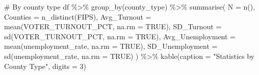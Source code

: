 \documentclass[
  11pt,
]{article}
\newenvironment{Shaded}{\begin{snugshade}}{\end{snugshade}}
\newcommand{\AttributeTok}[1]{\textcolor[rgb]{0.40,0.45,0.13}{#1}}
\newcommand{\CommentTok}[1]{\textcolor[rgb]{0.37,0.37,0.37}{#1}}
\newcommand{\ConstantTok}[1]{\textcolor[rgb]{0.56,0.35,0.01}{#1}}
\newcommand{\DecValTok}[1]{\textcolor[rgb]{0.68,0.00,0.00}{#1}}
\newcommand{\FunctionTok}[1]{\textcolor[rgb]{0.28,0.35,0.67}{#1}}
\newcommand{\NormalTok}[1]{\textcolor[rgb]{0.00,0.23,0.31}{#1}}
\newcommand{\SpecialCharTok}[1]{\textcolor[rgb]{0.37,0.37,0.37}{#1}}
\newcommand{\StringTok}[1]{\textcolor[rgb]{0.13,0.47,0.30}{#1}}
\begin{document}
\begin{Shaded}
\begin{Highlighting}[]
\CommentTok{\# By county type}
\NormalTok{df }\SpecialCharTok{\%\textgreater{}\%}
  \FunctionTok{group\_by}\NormalTok{(county\_type) }\SpecialCharTok{\%\textgreater{}\%}
  \FunctionTok{summarise}\NormalTok{(}
    \AttributeTok{N =} \FunctionTok{n}\NormalTok{(),}
    \AttributeTok{Counties =} \FunctionTok{n\_distinct}\NormalTok{(FIPS),}
    \AttributeTok{Avg\_Turnout =} \FunctionTok{mean}\NormalTok{(VOTER\_TURNOUT\_PCT, }\AttributeTok{na.rm =} \ConstantTok{TRUE}\NormalTok{),}
    \AttributeTok{SD\_Turnout =} \FunctionTok{sd}\NormalTok{(VOTER\_TURNOUT\_PCT, }\AttributeTok{na.rm =} \ConstantTok{TRUE}\NormalTok{),}
    \AttributeTok{Avg\_Unemployment =} \FunctionTok{mean}\NormalTok{(unemployment\_rate, }\AttributeTok{na.rm =} \ConstantTok{TRUE}\NormalTok{),}
    \AttributeTok{SD\_Unemployment =} \FunctionTok{sd}\NormalTok{(unemployment\_rate, }\AttributeTok{na.rm =} \ConstantTok{TRUE}\NormalTok{)}
\NormalTok{  ) }\SpecialCharTok{\%\textgreater{}\%}
  \FunctionTok{kable}\NormalTok{(}\AttributeTok{caption =} \StringTok{"Statistics by County Type"}\NormalTok{, }\AttributeTok{digits =} \DecValTok{3}\NormalTok{)}
\end{Highlighting}
\end{Shaded}
\end{document}
